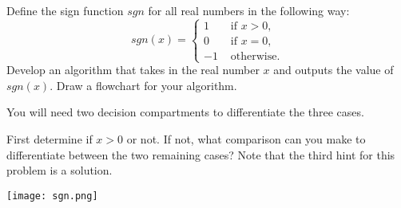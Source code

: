 \documentclass{ximera}
\begin{document}
\begin{question}
	Define the sign function $sgn$ for all real numbers in the following way:
	$$ sgn(x) = \begin{cases} 1 & \text{ if $x>0$,}\\
		                0 & \text{ if $x=0$,}\\
			       -1 & \text{ otherwise.}
	\end{cases}$$
	Develop an algorithm that takes in the real number $x$ and outputs the value of $sgn(x)$. Draw a flowchart for your algorithm.

	\begin{hint}
		You will need two decision compartments to differentiate the three cases. 
	\end{hint}
	\begin{hint}
		First determine if $x>0$ or not. If not, what comparison can you make to differentiate between the two remaining cases? Note that the third hint for this problem is a solution.
	\end{hint}
	\begin{hint}
		\begin{center}
		\texttt{[image: sgn.png]}
		\end{center}
	\end{hint}
\end{question}
\end{document}
